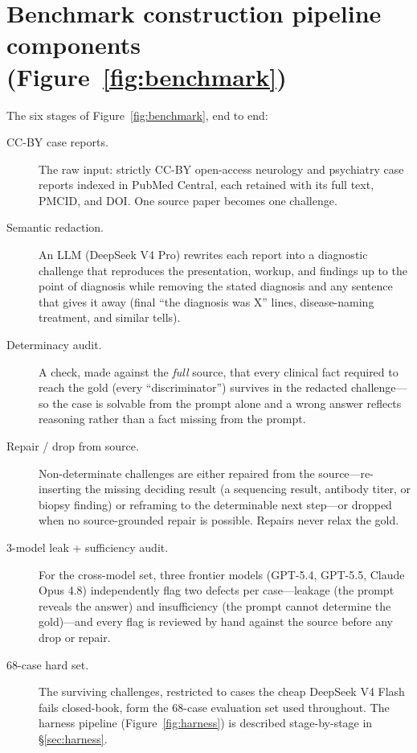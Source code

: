 \documentclass{article}
\begin{document}



\appendix
\renewcommand{\thesection}{Appendix~\Alph{section}}

\section{Benchmark construction pipeline components (Figure~\ref{fig:benchmark})}\label{app:bench-components}
The six stages of Figure~\ref{fig:benchmark}, end to end:
\begin{description}
\item[CC-BY case reports.] The raw input: strictly CC-BY open-access neurology and psychiatry case reports
indexed in PubMed Central, each retained with its full text, PMCID, and DOI. One source paper becomes one
challenge.
\item[Semantic redaction.] An LLM (DeepSeek V4 Pro) rewrites each report into a diagnostic challenge that
reproduces the presentation, workup, and findings up to the point of diagnosis while removing the stated
diagnosis and any sentence that gives it away (final ``the diagnosis was X'' lines, disease-naming treatment,
and similar tells).
\item[Determinacy audit.] A check, made against the \emph{full} source, that every clinical fact required to
reach the gold (every ``discriminator'') survives in the redacted challenge---so the case is solvable from
the prompt alone and a wrong answer reflects reasoning rather than a fact missing from the prompt.
\item[Repair / drop from source.] Non-determinate challenges are either repaired from the source---re-inserting
the missing deciding result (a sequencing result, antibody titer, or biopsy finding) or reframing to the
determinable next step---or dropped when no source-grounded repair is possible. Repairs never relax the gold.
\item[3-model leak + sufficiency audit.] For the cross-model set, three frontier models (GPT-5.4, GPT-5.5,
Claude Opus 4.8) independently flag two defects per case---leakage (the prompt reveals the answer) and
insufficiency (the prompt cannot determine the gold)---and every flag is reviewed by hand against the source
before any drop or repair.
\item[68-case hard set.] The surviving challenges, restricted to cases the cheap DeepSeek V4 Flash fails
closed-book, form the 68-case evaluation set used throughout. The harness pipeline (Figure~\ref{fig:harness})
is described stage-by-stage in \S\ref{sec:harness}.
\end{description}
\end{document}
